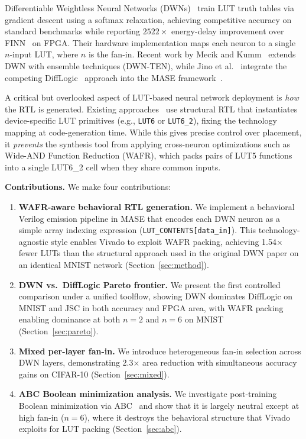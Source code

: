 \documentclass[conference]{IEEEtran}
\begin{document}
Differentiable Weightless Neural Networks (DWNs)~\cite{bacellar2024dwn} train LUT truth tables via gradient descent using a softmax relaxation, achieving competitive accuracy on standard benchmarks while reporting $2522\times$ energy-delay improvement over FINN~\cite{umuroglu2017finn} on FPGA.
Their hardware implementation maps each neuron to a single $n$-input LUT, where $n$ is the fan-in.
Recent work by Mecik and Kumm~\cite{mecik2025dwnten} extends DWN with ensemble techniques (DWN-TEN), while Jino et al.~\cite{jino2024difflogic} integrate the competing DiffLogic~\cite{petersen2022difflogic} approach into the MASE framework~\cite{mase2024}.

A critical but overlooked aspect of LUT-based neural network deployment is \emph{how} the RTL is generated.
Existing approaches~\cite{bacellar2024dwn, mecik2025dwnten} use structural RTL that instantiates device-specific LUT primitives (e.g., \texttt{LUT6} or \texttt{LUT6\_2}), fixing the technology mapping at code-generation time.
While this gives precise control over placement, it \emph{prevents} the synthesis tool from applying cross-neuron optimizations such as Wide-AND Function Reduction (WAFR), which packs pairs of LUT5 functions into a single LUT6\_2 cell when they share common inputs.

\textbf{Contributions.}
We make four contributions:
\begin{enumerate}
    \item \textbf{WAFR-aware behavioral RTL generation.}
    We implement a behavioral Verilog emission pipeline in MASE that encodes each DWN neuron as a simple array indexing expression (\texttt{LUT\_CONTENTS[data\_in]}). This technology-agnostic style enables Vivado to exploit WAFR packing, achieving 1.54$\times$ fewer LUTs than the structural approach used in the original DWN paper on an identical MNIST network (Section~\ref{sec:method}).

    \item \textbf{DWN vs.\ DiffLogic Pareto frontier.}
    We present the first controlled comparison under a unified toolflow, showing DWN dominates DiffLogic on MNIST and JSC in both accuracy and FPGA area, with WAFR packing enabling dominance at both $n{=}2$ and $n{=}6$ on MNIST (Section~\ref{sec:pareto}).

    \item \textbf{Mixed per-layer fan-in.}
    We introduce heterogeneous fan-in selection across DWN layers, demonstrating 2.3$\times$ area reduction with simultaneous accuracy gains on CIFAR-10 (Section~\ref{sec:mixed}).

    \item \textbf{ABC Boolean minimization analysis.}
    We investigate post-training Boolean minimization via ABC~\cite{brayton2010abc} and show that it is largely neutral except at high fan-in ($n{=}6$), where it destroys the behavioral structure that Vivado exploits for LUT packing (Section~\ref{sec:abc}).
\end{enumerate}
\end{document}
